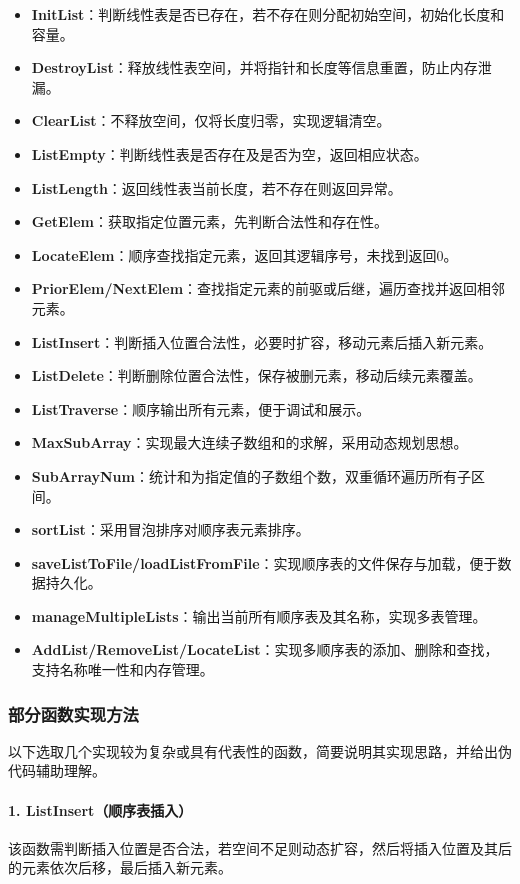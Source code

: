 \documentclass[supercite]{Experimental_Report}
\theoremstyle{definition}
\begin{document}
\begin{itemize}
    \item \textbf{InitList}：判断线性表是否已存在，若不存在则分配初始空间，初始化长度和容量。
    \item \textbf{DestroyList}：释放线性表空间，并将指针和长度等信息重置，防止内存泄漏。
    \item \textbf{ClearList}：不释放空间，仅将长度归零，实现逻辑清空。
    \item \textbf{ListEmpty}：判断线性表是否存在及是否为空，返回相应状态。
    \item \textbf{ListLength}：返回线性表当前长度，若不存在则返回异常。
    \item \textbf{GetElem}：获取指定位置元素，先判断合法性和存在性。
    \item \textbf{LocateElem}：顺序查找指定元素，返回其逻辑序号，未找到返回0。
    \item \textbf{PriorElem/NextElem}：查找指定元素的前驱或后继，遍历查找并返回相邻元素。
    \item \textbf{ListInsert}：判断插入位置合法性，必要时扩容，移动元素后插入新元素。
    \item \textbf{ListDelete}：判断删除位置合法性，保存被删元素，移动后续元素覆盖。
    \item \textbf{ListTraverse}：顺序输出所有元素，便于调试和展示。
    \item \textbf{MaxSubArray}：实现最大连续子数组和的求解，采用动态规划思想。
    \item \textbf{SubArrayNum}：统计和为指定值的子数组个数，双重循环遍历所有子区间。
    \item \textbf{sortList}：采用冒泡排序对顺序表元素排序。
    \item \textbf{saveListToFile/loadListFromFile}：实现顺序表的文件保存与加载，便于数据持久化。
    \item \textbf{manageMultipleLists}：输出当前所有顺序表及其名称，实现多表管理。
    \item \textbf{AddList/RemoveList/LocateList}：实现多顺序表的添加、删除和查找，支持名称唯一性和内存管理。
\end{itemize}

\subsubsection{部分函数实现方法}

以下选取几个实现较为复杂或具有代表性的函数，简要说明其实现思路，并给出伪代码辅助理解。

\paragraph{1. ListInsert（顺序表插入）}
该函数需判断插入位置是否合法，若空间不足则动态扩容，然后将插入位置及其后的元素依次后移，最后插入新元素。
\end{document}
